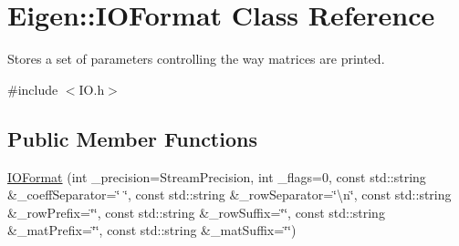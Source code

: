 \hypertarget{struct_eigen_1_1_i_o_format}{}\section{Eigen\+::I\+O\+Format Class Reference}
\label{struct_eigen_1_1_i_o_format}


Stores a set of parameters controlling the way matrices are printed.  




{\ttfamily \#include $<$I\+O.\+h$>$}

\subsection*{Public Member Functions}
\begin{DoxyCompactItemize}
\item 
\mbox{\hyperlink{struct_eigen_1_1_i_o_format_a840cac6401adc4de421260d63dc3d861}{I\+O\+Format}} (int \+\_\+precision=Stream\+Precision, int \+\_\+flags=0, const std\+::string \&\+\_\+coeff\+Separator=\char`\"{} \char`\"{}, const std\+::string \&\+\_\+row\+Separator=\char`\"{}\textbackslash{}n\char`\"{}, const std\+::string \&\+\_\+row\+Prefix=\char`\"{}\char`\"{}, const std\+::string \&\+\_\+row\+Suffix=\char`\"{}\char`\"{}, const std\+::string \&\+\_\+mat\+Prefix=\char`\"{}\char`\"{}, const std\+::string \&\+\_\+mat\+Suffix=\char`\"{}\char`\"{})
\end{DoxyCompactItemize}
